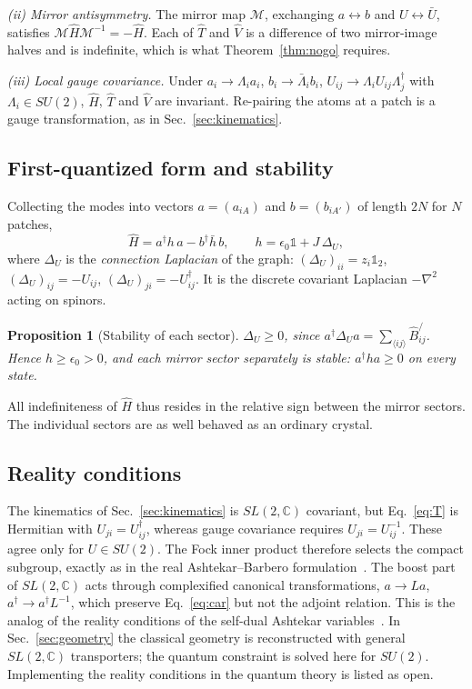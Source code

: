 \documentclass[reprint,aps,prd,amsmath,amssymb,superscriptaddress,nofootinbib,floatfix]{revtex4-2}
\theoremstyle{plain}
\newtheorem{proposition}{Proposition}
\theoremstyle{definition}
\theoremstyle{remark}
\newcommand{\Lat}{\ensuremath{/}}                 %
\newcommand{\Hc}{\hat{H}}
\newcommand{\Tc}{\hat{T}}
\newcommand{\Vc}{\hat{V}}
\newcommand{\one}{\mathbb{1}}
\newcommand{\SLC}{SL(2,\mathbb{C})}
\newcommand{\SU}{SU(2)}
\begin{document}
\emph{(ii) Mirror antisymmetry.} The mirror map $\mathcal{M}$, exchanging $a\leftrightarrow b$ and
$U\leftrightarrow\bar U$, satisfies $\mathcal{M}\Hc\mathcal{M}^{-1}=-\Hc$. Each of $\Tc$ and $\Vc$ is a
difference of two mirror-image halves and is indefinite, which is what Theorem~\ref{thm:nogo} requires.

\emph{(iii) Local gauge covariance.} Under $a_i\to\Lambda_ia_i$, $b_i\to\bar\Lambda_ib_i$,
$U_{ij}\to\Lambda_iU_{ij}\Lambda_j^\dagger$ with $\Lambda_i\in\SU$, $\Hc$, $\Tc$ and $\Vc$ are invariant. Re-pairing the atoms at a patch
is a gauge transformation, as in Sec.~\ref{sec:kinematics}.

\subsection{First-quantized form and stability}

Collecting the modes into vectors $a=(a_{iA})$ and $b=(b_{iA'})$ of length $2N$ for $N$ patches,
\begin{equation}
\Hc=a^\dagger h\,a-b^\dagger\bar h\,b,\qquad
h=\epsilon_0\one+J\,\Delta_U ,
\label{eq:hfirst}
\end{equation}
where $\Delta_U$ is the \emph{connection Laplacian} of the graph: $(\Delta_U)_{ii}=z_i\one_2$,
$(\Delta_U)_{ij}=-U_{ij}$, $(\Delta_U)_{ji}=-U^\dagger_{ij}$. It is the discrete covariant Laplacian
$-\nabla^2$ acting on spinors.

\begin{proposition}[Stability of each sector]
\label{prop:stab}
$\Delta_U\ge0$, since $a^\dagger\Delta_Ua=\sum_{\langle ij\rangle}\hat B^{\Lat}_{ij}$. Hence $h\ge\epsilon_0>0$, and
each mirror sector separately is stable: $a^\dagger ha\ge0$ on every state.
\end{proposition}

All indefiniteness of $\Hc$ thus resides in the relative sign between the mirror sectors. The individual
sectors are as well behaved as an ordinary crystal.

\subsection{Reality conditions}
\label{sec:reality}

The kinematics of Sec.~\ref{sec:kinematics} is $\SLC$ covariant, but Eq.~\eqref{eq:T} is Hermitian with
$U_{ji}=U_{ij}^\dagger$, whereas gauge covariance requires $U_{ji}=U_{ij}^{-1}$. These agree only for
$U\in\SU$. The Fock inner product therefore selects the compact subgroup, exactly as in the real
Ashtekar--Barbero formulation~\cite{Barbero1995,Holst1996}. The boost part of $\SLC$ acts through
complexified canonical transformations, $a\to La$, $a^\dagger\to a^\dagger L^{-1}$, which preserve
Eq.~\eqref{eq:car} but not the adjoint relation. This is the analog of the reality conditions of the
self-dual Ashtekar variables~\cite{Ashtekar1986,ALMMT1995}. In Sec.~\ref{sec:geometry} the classical
geometry is reconstructed with general $\SLC$ transporters; the quantum constraint is solved here for
$\SU$. Implementing the reality conditions in the quantum theory is listed as open.
\end{document}
